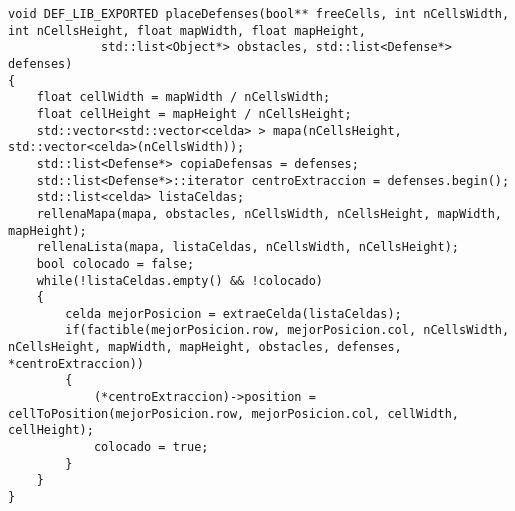 \begin{lstlisting}
void DEF_LIB_EXPORTED placeDefenses(bool** freeCells, int nCellsWidth, int nCellsHeight, float mapWidth, float mapHeight,
             std::list<Object*> obstacles, std::list<Defense*> defenses) 
{
    float cellWidth = mapWidth / nCellsWidth;
    float cellHeight = mapHeight / nCellsHeight; 
    std::vector<std::vector<celda> > mapa(nCellsHeight, std::vector<celda>(nCellsWidth));
    std::list<Defense*> copiaDefensas = defenses;
    std::list<Defense*>::iterator centroExtraccion = defenses.begin();
    std::list<celda> listaCeldas;
    rellenaMapa(mapa, obstacles, nCellsWidth, nCellsHeight, mapWidth, mapHeight);
    rellenaLista(mapa, listaCeldas, nCellsWidth, nCellsHeight);
    bool colocado = false;
    while(!listaCeldas.empty() && !colocado)
    {
        celda mejorPosicion = extraeCelda(listaCeldas);
        if(factible(mejorPosicion.row, mejorPosicion.col, nCellsWidth, nCellsHeight, mapWidth, mapHeight, obstacles, defenses, *centroExtraccion))
        {
            (*centroExtraccion)->position = cellToPosition(mejorPosicion.row, mejorPosicion.col, cellWidth, cellHeight);
            colocado = true;
        }
    }
}
\end{lstlisting}